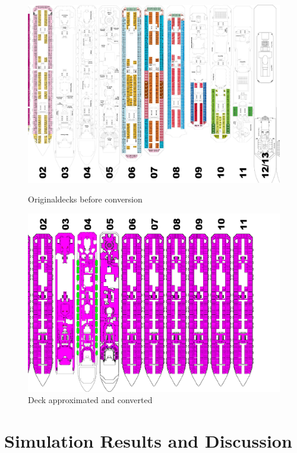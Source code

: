\documentclass[11pt]{article}
\begin{document}
\begin{figure}[H]
\centering
{\begin{minipage}[t]{7.4cm}
\includegraphics[angle=-90,width=\textwidth]{Decks.pdf}
\caption{Originaldecks before conversion}
\label{Decks}
\end{minipage}}
{\begin{minipage}[t]{7.4cm}
\includegraphics[angle=-90,width=\textwidth]{Decksconverted.pdf}
\caption{Deck approximated and converted}
\label{Decksconverted}
\end{minipage}}
\end{figure}

\newpage
\section{Simulation Results and Discussion}
\end{document}
